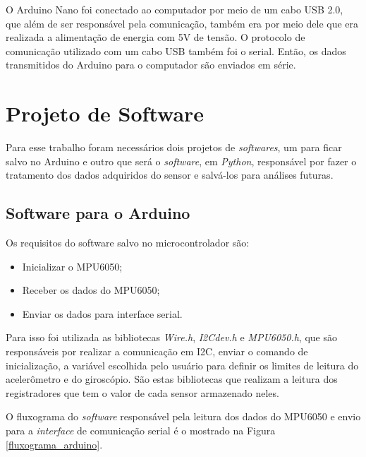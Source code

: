 		O Arduino Nano foi conectado ao computador por meio de um cabo USB 2.0, que além de ser responsável pela comunicação, também era por meio dele que era realizada a alimentação de energia com 5V de tensão. O protocolo de comunicação utilizado com um cabo USB também foi o serial. Então, os dados transmitidos do Arduino para o computador são enviados em série. 
		
		
\section {Projeto de Software}
		
		Para esse trabalho foram necessários dois projetos de \textit{softwares}, um para ficar salvo no Arduino e outro que será o \textit{software}, em \textit{Python}, responsável por fazer o tratamento dos dados adquiridos do sensor e salvá-los para análises futuras.
		
		\subsection{Software para o Arduino}
			Os requisitos do software salvo no microcontrolador são:
			\begin{itemize}
				\item Inicializar o MPU6050;
				\item Receber os dados do MPU6050; 
				\item Enviar os dados para interface serial.
			\end{itemize}
		
		Para isso foi utilizada as bibliotecas \textit{Wire.h}, \textit{I2Cdev.h} e \textit{MPU6050.h}, que são responsáveis por realizar a comunicação em I2C, enviar o comando de inicialização, a variável escolhida pelo usuário para definir os limites de leitura do acelerômetro e do giroscópio. São estas bibliotecas que realizam a leitura dos registradores que tem o valor de cada sensor armazenado neles.  
		
		O fluxograma do \textit{software} responsável pela leitura dos dados do MPU6050 e envio para a \textit{interface} de comunicação serial é o mostrado na Figura \ref{fluxograma_arduino}. 
		
